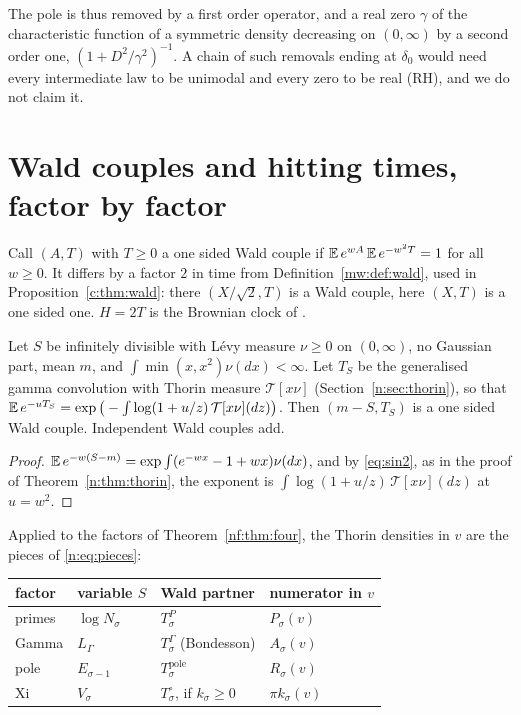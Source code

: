 The pole is thus removed by a first order operator, and a real zero $\gamma$ of the characteristic function of a symmetric density decreasing on $(0,\infty)$ by a second order one, $(1+D^2/\gamma^2)^{-1}$. A chain of such removals ending at $\delta_0$ would need every intermediate law to be unimodal and every zero to be real (RH), and we do not claim it.

\section{Wald couples and hitting times, factor by factor}\label{nf:sec:wald}

Call $(A,T)$ with $T\ge0$ a one sided Wald couple if $\mathbb{E}\,e^{wA}\,\mathbb{E}\,e^{-w^2T}=1$ for all $w\ge0$. It differs by a factor $2$ in time from Definition~\ref{mw:def:wald}, used in Proposition~\ref{c:thm:wald}: there $(X/\sqrt2,T)$ is a Wald couple, here $(X,T)$ is a one sided one. $H=2T$ is the Brownian clock of \cite{RoynetteYor05}.

\begin{proposition}[proved]\label{nf:prop:wald}
Let $S$ be infinitely divisible with L\'evy measure $\nu\ge0$ on $(0,\infty)$, no Gaussian part, mean $m$, and $\int\min(x,x^2)\nu(dx)<\infty$. Let $T_S$ be the generalised gamma convolution with Thorin measure $\mathcal T[x\nu]$ (Section~\ref{n:sec:thorin}), so that $\mathbb{E}\,e^{-uT_S}=\exp\big(-\int\log(1+u/z)\,\mathcal T[x\nu](dz)\big)$. Then $(m-S,T_S)$ is a one sided Wald couple. Independent Wald couples add.
\end{proposition}

\begin{proof}
$\mathbb{E}\,e^{-w(S-m)}=\exp\int(e^{-wx}-1+wx)\nu(dx)$, and by \eqref{eq:sin2}, as in the proof of Theorem~\ref{n:thm:thorin}, the exponent is $\int\log(1+u/z)\,\mathcal T[x\nu](dz)$ at $u=w^2$.
\end{proof}

Applied to the factors of Theorem~\ref{nf:thm:four}, the Thorin densities in $v$ are the pieces of \eqref{n:eq:pieces}:
\begin{center}
\small
\begin{tabular}{llll}
\toprule
factor & variable $S$ & Wald partner & numerator in $v$\\
\midrule
primes & $\log N_\sigma$ & $T^P_\sigma$ & $P_\sigma(v)$\\
Gamma & $L_\Gamma$ & $T^\Gamma_\sigma$ (Bondesson) & $A_\sigma(v)$\\
pole & $E_{\sigma-1}$ & $T^{\mathrm{pole}}_\sigma$ & $R_\sigma(v)$\\
Xi & $V_\sigma$ & $T^\circ_\sigma$, if $k_\sigma\ge0$ & $\pi k_\sigma(v)$\\
\bottomrule
\end{tabular}
\end{center}


